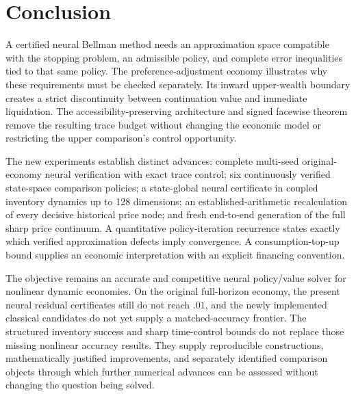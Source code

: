 \section{Conclusion}\label{sec:conclusion}
A certified neural Bellman method needs an approximation space compatible with the stopping problem, an admissible policy, and complete error inequalities tied to that same policy. The preference-adjustment economy illustrates why these requirements must be checked separately. Its inward upper-wealth boundary creates a strict discontinuity between continuation value and immediate liquidation. The accessibility-preserving architecture and signed facewise theorem remove the resulting trace budget without changing the economic model or restricting the upper comparison's control opportunity.

The new experiments establish distinct advances: complete multi-seed original-economy neural verification with exact trace control; six continuously verified state-space comparison policies; a state-global neural certificate in coupled inventory dynamics up to 128 dimensions; an established-arithmetic recalculation of every decisive historical price node; and fresh end-to-end generation of the full sharp price continuum. A quantitative policy-iteration recurrence states exactly which verified approximation defects imply convergence. A consumption-top-up bound supplies an economic interpretation with an explicit financing convention.

The objective remains an accurate and competitive neural policy/value solver for nonlinear dynamic economies. On the original full-horizon economy, the present neural residual certificates still do not reach $.01$, and the newly implemented classical candidates do not yet supply a matched-accuracy frontier. The structured inventory success and sharp time-control bounds do not replace those missing nonlinear accuracy results. They supply reproducible constructions, mathematically justified improvements, and separately identified comparison objects through which further numerical advances can be assessed without changing the question being solved.
